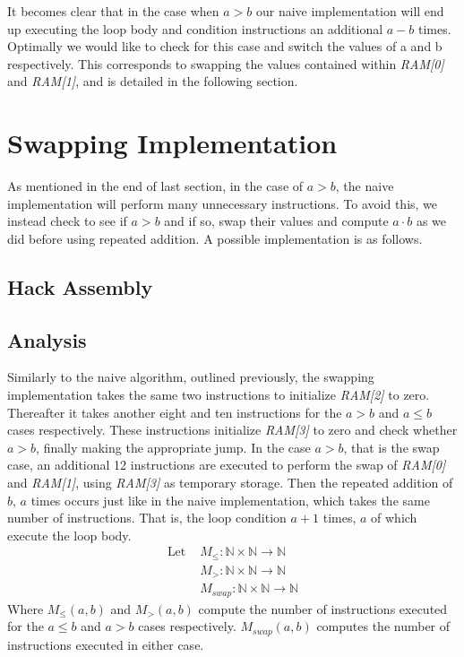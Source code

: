 \documentclass[a4paper,10pt,fleqn]{article}
\begin{document}
It becomes clear that in the case when $a > b$ our naive implementation will end up executing
the loop body and condition instructions an additional $a - b$ times. Optimally we would like
to check for this case and switch the values of a and b respectively. This corresponds to
swapping the values contained within \emph{RAM[0]} and \emph{RAM[1]}, and is detailed in the following section.

\section{Swapping Implementation}
\label{swap_section}
As mentioned in the end of last section, in the case of $a > b$, the naive implementation will
perform many unnecessary instructions. To avoid this, we instead check to see if $a > b$ and if
so, swap their values and compute $a \cdot b$ as we did before using repeated addition. A possible implementation is as follows.

\subsection{Hack Assembly}


\subsection{Analysis}
\label{swap_analysis}
Similarly to the naive algorithm, outlined previously, the swapping implementation takes the
same two instructions to initialize \emph{RAM[2]} to zero. Thereafter it takes another eight and
ten instructions for the $a > b$ and $a \leq b$ cases respectively. These instructions
initialize \emph{RAM[3]} to zero and check whether $a > b$, finally making the appropriate
jump. In the case $a > b$, that is the swap case, an additional 12 instructions are executed to
perform the swap of \emph{RAM[0]} and \emph{RAM[1]}, using \emph{RAM[3]} as temporary storage.
Then the repeated addition of $b$, $a$ times occurs just like in the naive implementation,
which takes the same number of instructions. That is, the loop condition $a + 1$ times, $a$ of
which execute the loop body.
\begin{align*}
    \text{Let } & M_{\leq} : \mathbb{N} \times \mathbb{N} \to \mathbb{N} \\
    & M_{>} : \mathbb{N} \times \mathbb{N} \to \mathbb{N} \\
    & M_{swap} : \mathbb{N} \times \mathbb{N} \to \mathbb{N}
\end{align*}
Where $M_{\leq}(a,b)$ and $M_{>}(a,b)$ compute the number of instructions executed for the
$a \leq b$ and $a > b$ cases respectively. $M_{swap}(a,b)$ computes the number of instructions
executed in either case.
\end{document}
